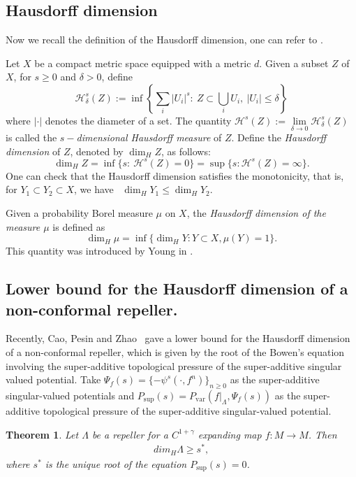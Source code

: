 \documentclass[11pt,a4paper]{amsart}
\theoremstyle{plain}
\newtheorem{Thm}{Theorem}[section]
\theoremstyle{remark}
\begin{document}
	\subsection{Hausdorff dimension}
	Now we recall the definition of the Hausdorff dimension, one can refer to \cite{Pesin}.
	
	Let $X$ be a compact metric space equipped with a metric $d$. Given  a subset $Z$ of $X$, for $s\geq 0$ and $\delta>0$, define
	\[
	\mathcal{H}_{\delta}^{s}(Z):=\inf \left\{\sum_{i}|U_i|^s: \
	Z\subset \bigcup_{i}U_i,~|U_i|\leq \delta\right\}
	\]
	where $|\cdot|$ denotes the diameter of a set. The quantity
	$\mathcal{H}^{s}(Z):=\lim\limits_{\delta\rightarrow 0}\mathcal{H}_{\delta}^{s}(Z)$ is called the {\em $s-$dimensional Hausdorff measure} of $Z$. Define the {\em Hausdorff dimension} of $Z$, denoted by $\dim_H  Z$, as follows:
	\[
	\dim_H  Z =\inf \{s:\ \mathcal{H}^{s}(Z)=0\}=\sup \{s: \mathcal{H}^{s}(Z)=\infty\}.
	\]
	One can check that the Hausdorff dimension satisfies the monotonicity, that is, for $Y_{1}\subset Y_{2}\subset X$, we have ~$\dim_{H}Y_{1}\leq \dim_{H}Y_{2}$.
	
	
	Given a probability Borel measure $\mu$ on $X$, the {\it Hausdorff dimension of the measure $\mu$}  is defined as $$\dim_{H}\mu=\inf\{\dim_{H}Y:Y\subset X ,  \mu(Y)=1\}.$$ This quantity was introduced by Young in \cite{Young}.
	\subsection{Lower bound for the Hausdorff dimension of a non-conformal repeller.}
	Recently, Cao, Pesin and Zhao~\cite{caopesinzhao2019} gave a lower bound for the Hausdorff dimension of a non-conformal repeller, which is given by the root of the Bowen's equation involving the super-additive topological pressure of the super-additive singular valued potential. Take $\Psi_{f}(s)=\{-\psi^{s}(\cdot,f^{n})\}_{n\geq 0}$ as the super-additive singular-valued potentials and  $P_{\text{sup}}(s)=P_{\text{var}}(f|_{\Lambda},\Psi_{f}(s))$ as the super-additive topological pressure of the super-additive singular-valued potential.
	\begin{Thm}\cite{caopesinzhao2019}\label{lower bound}
		Let $\Lambda$ be a repeller for a $C^{1+\gamma}$ expanding map $f:M\rightarrow M$. Then
		\begin{align*}
			dim_{H}\Lambda\geq s^{\ast},
		\end{align*}
		where $s^{\ast}$ is the unique root of the equation $P_{\text{sup}}(s)=0$.
	\end{Thm}
	
\end{document}
